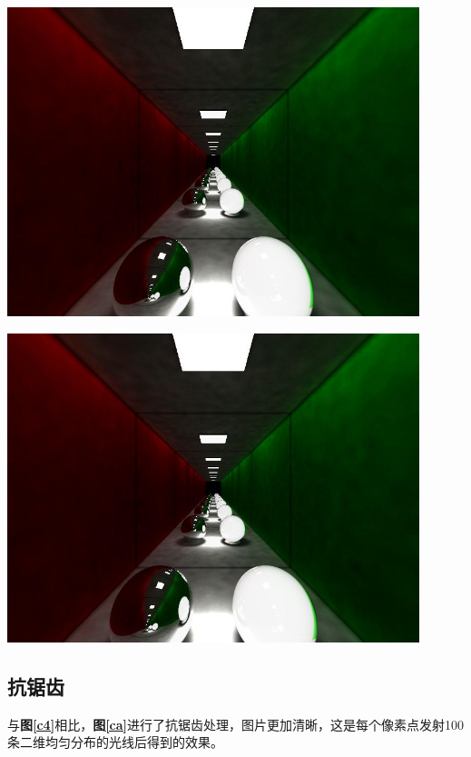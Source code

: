 \documentclass[11pt, a4paper]{article}
\makeatletter
\newcommand\fcaption{\def\@captype{figure}\caption}
\newcommand{\fref}[1]{\textbf{图\ref{#1}}}
\makeatother
\begin{document}
\begin{center}
    \includegraphics[width=12cm]{../outputs/two_balls_3.jpeg}
    \fcaption{Two balls (fovy=46)}\label{c3}
\end{center}

\begin{center}
    \includegraphics[width=12cm]{../outputs/two_balls_4.jpeg}
    \fcaption{Two balls (fovy=45)}\label{c4}
\end{center}

\subsection{抗锯齿}

与\fref{c4}相比，\fref{ca}进行了抗锯齿处理，图片更加清晰，这是每个像素点发射100条二维均匀分布的光线后得到的效果。
\end{document}
